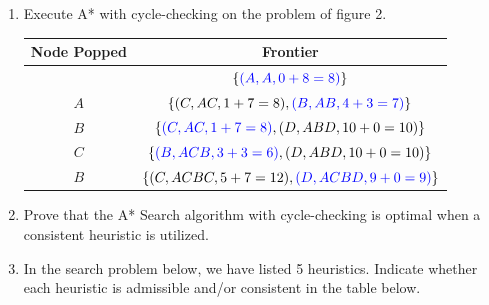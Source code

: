 \begin{enumerate}
    \item Execute A* with cycle-checking on the problem of figure 2.

    \begin{solution} \begin{table}[ht!] \color{primary}
        \centering
        \renewcommand{\arraystretch}{1.15}

        \begin{tabular}{||c|c||}
            \hline
            Node Popped & Frontier                                                \\ \hline \hline
                        & $\{ {\color{blue}(A,A, 0+8=8)} \}$                      \\ \hline
            $A$         & $\{ (C,AC, 1+7=8), {\color{blue}(B,AB, 4+3=7)} \}$      \\ \hline
            $B$         & $\{ {\color{blue}(C,AC, 1+7=8)}, (D,ABD, 10+0=10) \}$   \\ \hline
            $C$         & $\{ {\color{blue}(B,ACB, 3+3=6)}, (D,ABD, 10+0=10) \}$  \\ \hline
            $B$         & $\{ (C,ACBC, 5+7=12), {\color{blue}(D,ACBD, 9+0=9)} \}$ \\ \hline
        \end{tabular}
    \end{table} \end{solution}

    \item Prove that the A* Search algorithm with cycle-checking is optimal when a consistent heuristic is utilized.


    \item In the search problem below, we have listed 5 heuristics. Indicate whether each heuristic is admissible and/or consistent in the table below.

    \begin{remark}
    \end{remark}

    \begin{table}[ht!]
        \centering


\end{table}
\end{enumerate}
